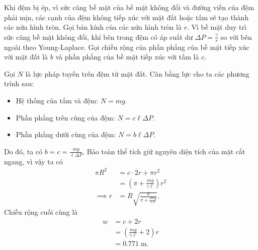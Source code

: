 \begin{solution}

Khi đệm bị ép, vì sức căng bề mặt của bề mặt không đổi và đường viền của đệm phải mịn, các cạnh của đệm không tiếp xúc với mặt đất hoặc tấm sẽ tạo thành các nửa hình tròn. Gọi bán kính của các nửa hình tròn là $r$. Vì bề mặt duy trì sức căng bề mặt không đổi, khí bên trong đệm có áp suất dư $\Delta P=\frac{\gamma}{r}$ so với bên ngoài theo Young-Laplace. Gọi chiều rộng của phần phẳng của bề mặt tiếp xúc với mặt đất là $b$ và phần phẳng của bề mặt tiếp xúc với tấm là $c$.

Gọi $N$ là lực pháp tuyến trên đệm từ mặt đất. Cân bằng lực cho ta các phương trình sau:
\begin{itemize}
    \item Hệ thống của tấm và đệm: $N=mg$.
    \item Phần phẳng trên cùng của đệm: $N=c\ell\Delta P$.
    \item Phần phẳng dưới cùng của đệm: $N=b\ell\Delta P$.
\end{itemize}
Do đó, ta có $b=c=\frac{mg}{\ell\Delta P}$.
Bảo toàn thể tích giữ nguyên diện tích của mặt cắt ngang, vì vậy ta có
\begin{align*}
    \pi R^2 &= c\cdot 2r+\pi r^2 \\
            &= (\pi+\frac{mg}{\gamma\ell})r^2 \\
    \implies r&=R\sqrt{\frac{\pi}{\pi+\frac{2mg}{\gamma\ell}}}.
\end{align*}
Chiều rộng cuối cùng là
\begin{align*}
    w &= c+2r \\
      &= (\frac{mg}{\gamma\ell}+2)r \\
      &= \boxed{0.771\;\mathrm{m}}.
\end{align*}

\end{solution}
